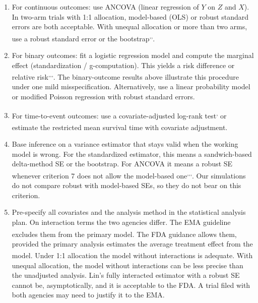 \documentclass[
  11pt,
]{article}
\providecommand{\tightlist}{%
  \setlength{\itemsep}{0pt}\setlength{\parskip}{0pt}}
\begin{document}
\begin{enumerate}
\def\labelenumi{\arabic{enumi}.}
\setcounter{enumi}{6}
\tightlist
\item
  For continuous outcomes: use ANCOVA (linear
  regression of \(Y\) on \(Z\) and \(X\)). In two-arm trials
  with 1:1 allocation, model-based (OLS) or robust
  standard errors are both acceptable. With unequal
  allocation or more than two arms, use a robust
  standard error or the bootstrap\textsuperscript{,,}.
\item
  For binary outcomes: fit a logistic regression
  model and compute the marginal effect
  (standardization / g-computation). This yields a
  risk difference or relative risk\textsuperscript{,,,}.
  The binary-outcome results above illustrate this
  procedure under one mild misspecification.
  Alternatively, use a linear probability model or
  modified Poisson regression with robust standard
  errors.
\item
  For time-to-event outcomes: use a covariate-adjusted
  log-rank test\textsuperscript{,} or
  estimate the restricted mean survival time with
  covariate adjustment\textsuperscript{}.
\item
  Base inference on a variance estimator that stays
  valid when the working model is wrong. For the
  standardized estimator, this means a sandwich-based
  delta-method SE or the bootstrap. For ANCOVA it
  means a robust SE whenever criterion 7 does not
  allow the model-based one\textsuperscript{,,,}. Our simulations do not
  compare robust with model-based SEs, so they do not
  bear on this criterion.
\item
  Pre-specify all covariates and the analysis method
  in the statistical analysis plan. On interaction
  terms the two agencies differ. The EMA guideline
  excludes them from the primary model\textsuperscript{}. The FDA guidance
  allows them, provided the primary analysis estimates
  the average treatment effect from the model\textsuperscript{}. Under 1:1 allocation
  the model without interactions is adequate\textsuperscript{}. With unequal allocation, the
  model without interactions can be less precise than
  the unadjusted analysis. Lin's fully interacted
  estimator with a robust SE cannot be, asymptotically,
  and it is acceptable to the FDA. A trial filed with
  both agencies may need to justify it to the EMA.
\end{enumerate}
\end{document}
